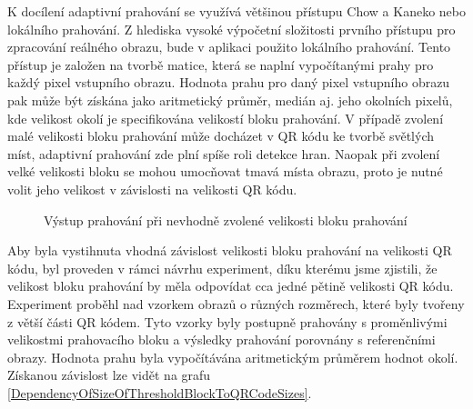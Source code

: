 K docílení adaptivní prahování se využívá většinou přístupu Chow a Kaneko nebo
lokálního prahování. Z hlediska vysoké výpočetní složitosti prvního přístupu
pro zpracování reálného obrazu, bude v aplikaci použito lokálního prahování.
Tento přístup je založen na tvorbě matice, která se naplní vypočítanými prahy
pro každý pixel vstupního obrazu. Hodnota prahu pro daný pixel vstupního obrazu
pak může být získána jako aritmetický průměr, medián aj. jeho okolních pixelů,
kde velikost okolí je specifikována velikostí bloku prahování. V případě zvolení
malé velikosti bloku prahování může docházet v QR kódu ke tvorbě světlých míst,
adaptivní prahování zde plní spíše roli detekce hran. Naopak při zvolení velké
velikosti bloku se mohou umocňovat tmavá místa obrazu, proto je nutné volit
jeho velikost v závislosti na velikosti QR kódu. \cite{adaptiveThresholdLit}

\begin{figure}[H]
  \begin{center}
    \caption{Výstup prahování při nevhodně zvolené velikosti bloku prahování}
    \label{LocalThresholdingBadSizeOfThresholdBlock}
  \end{center}
\end{figure}

Aby byla vystihnuta vhodná závislost velikosti bloku prahování na velikosti QR
kódu, byl proveden v rámci návrhu experiment, díku kterému jsme zjistili, že
velikost bloku prahování by měla odpovídat cca jedné pětině velikosti QR kódu.
Experiment proběhl nad vzorkem obrazů o různých rozměrech, které byly tvořeny z
větší části QR kódem. Tyto vzorky byly postupně prahovány s proměnlivými
velikostmi prahovacího bloku a výsledky prahování porovnány s referenčními
obrazy. Hodnota prahu byla vypočítávána aritmetickým průměrem hodnot
okolí. Získanou závislost lze vidět na
grafu \ref{DependencyOfSizeOfThresholdBlockToQRCodeSizes}.

